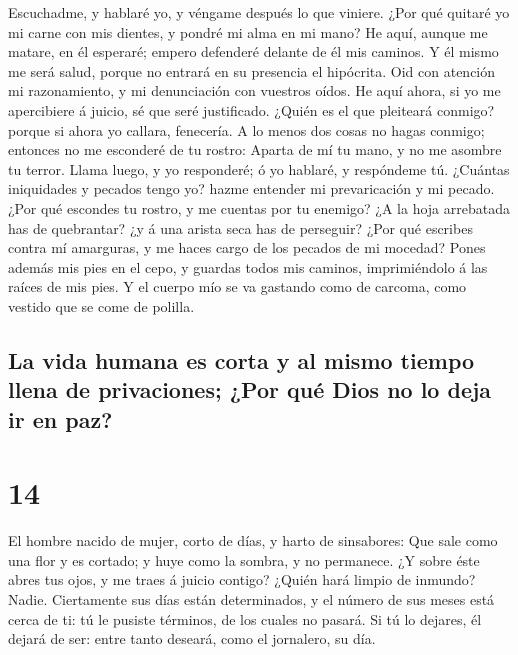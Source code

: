  Escuchadme, y hablaré yo, y véngame después lo que
viniere.  ¿Por qué quitaré yo mi carne con mis dientes, y
pondré mi alma en mi mano?  He aquí, aunque me matare, en
él esperaré; empero defenderé delante de él mis caminos.  Y
él mismo me será salud, porque no entrará en su presencia el hipócrita.
 Oid con atención mi razonamiento, y mi denunciación con
vuestros oídos.  He aquí ahora, si yo me apercibiere á
juicio, sé que seré justificado.  ¿Quién es el que
pleiteará conmigo? porque si ahora yo callara, fenecería. 
A lo menos dos cosas no hagas conmigo; entonces no me esconderé de tu
rostro:  Aparta de mí tu mano, y no me asombre tu terror.
 Llama luego, y yo responderé; ó yo hablaré, y respóndeme
tú.  ¿Cuántas iniquidades y pecados tengo yo? hazme
entender mi prevaricación y mi pecado.  ¿Por qué escondes
tu rostro, y me cuentas por tu enemigo?  ¿A la hoja
arrebatada has de quebrantar? ¿y á una arista seca has de perseguir?
 ¿Por qué escribes contra mí amarguras, y me haces cargo de
los pecados de mi mocedad?  Pones además mis pies en el
cepo, y guardas todos mis caminos, imprimiéndolo á las raíces de mis
pies.  Y el cuerpo mío se va gastando como de carcoma, como
vestido que se come de polilla.

\hypertarget{la-vida-humana-es-corta-y-al-mismo-tiempo-llena-de-privaciones-por-quuxe9-dios-no-lo-deja-ir-en-paz}{%
\subsection{La vida humana es corta y al mismo tiempo llena de
privaciones; ¿Por qué Dios no lo deja ir en
paz?}\label{la-vida-humana-es-corta-y-al-mismo-tiempo-llena-de-privaciones-por-quuxe9-dios-no-lo-deja-ir-en-paz}}

\hypertarget{section-13}{%
\section{14}\label{section-13}}

 El hombre nacido de mujer, corto de días, y harto de
sinsabores:  Que sale como una flor y es cortado; y huye
como la sombra, y no permanece.  ¿Y sobre éste abres tus
ojos, y me traes á juicio contigo?  ¿Quién hará limpio de
inmundo? Nadie.  Ciertamente sus días están determinados, y
el número de sus meses está cerca de ti: tú le pusiste términos, de los
cuales no pasará.  Si tú lo dejares, él dejará de ser: entre
tanto deseará, como el jornalero, su día.

